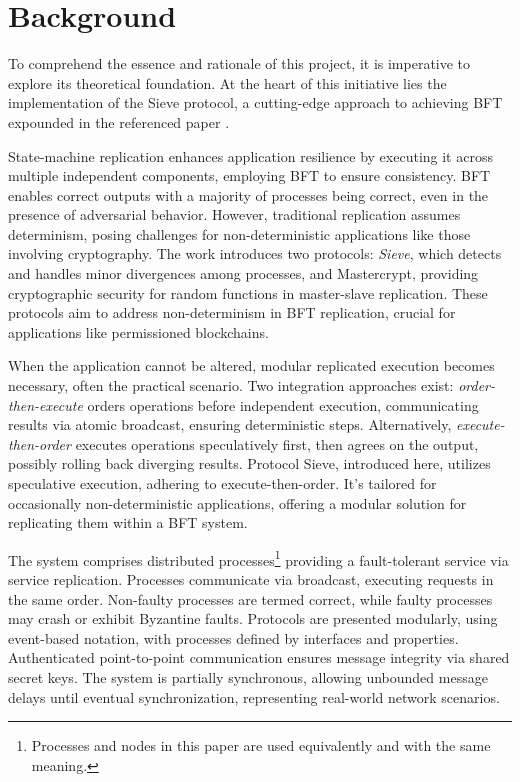 \documentclass{scrartcl}
\begin{document}
\newpage

\section{Background}

To comprehend the essence and rationale of this project, it is imperative to explore its theoretical foundation. At the heart of this initiative lies the implementation of the Sieve protocol, a cutting-edge approach to achieving BFT expounded in the referenced paper \cite{paper}.

State-machine replication enhances application resilience by executing it across multiple independent components, employing BFT to ensure consistency. BFT enables correct outputs with a majority of processes being correct, even in the presence of adversarial behavior. However, traditional replication assumes determinism, posing challenges for non-deterministic applications like those involving cryptography. The work introduces two protocols: \textit{Sieve}, which detects and handles minor divergences among processes, and Mastercrypt, providing cryptographic security for random functions in master-slave replication. These protocols aim to address non-determinism in BFT replication, crucial for applications like permissioned blockchains.

When the application cannot be altered, modular replicated execution becomes necessary, often the practical scenario. Two integration approaches exist: \textit{order-then-execute} orders operations before independent execution, communicating results via atomic broadcast, ensuring deterministic steps. Alternatively, \textit{execute-then-order} executes operations speculatively first, then agrees on the output, possibly rolling back diverging results. Protocol Sieve, introduced here, utilizes speculative execution, adhering to execute-then-order. It's tailored for occasionally non-deterministic applications, offering a modular solution for replicating them within a BFT system.

The system comprises distributed processes\footnote{Processes and nodes in this paper are used equivalently and with the same meaning.} providing a fault-tolerant service via service replication. Processes communicate via broadcast, executing requests in the same order. Non-faulty processes are termed correct, while faulty processes may crash or exhibit Byzantine faults. Protocols are presented modularly, using event-based notation, with processes defined by interfaces and properties. Authenticated point-to-point communication ensures message integrity via shared secret keys. The system is partially synchronous, allowing unbounded message delays until eventual synchronization, representing real-world network scenarios.
\end{document}
